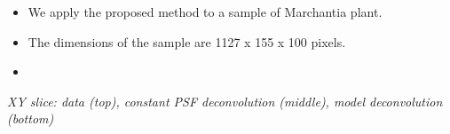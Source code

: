 \documentclass[a0paper,portrait,fontscale=0.35]{baposter}
\newcommand{\mycaption}[1]{
  {
    \smaller
    \emph{#1}
  }
}
\theoremstyle{plain}
\theoremstyle{plain}
\theoremstyle{definition}
\theoremstyle{plain}
\theoremstyle{definition}
\begin{document}
\begin{poster}
{\begin{minipage}[t]{0.48\textwidth}
\begin{minipage}[t]{0.5\textwidth}
      \begin{itemize}
        \item We apply the proposed method to a sample of 
          Marchantia plant.
        \item The dimensions of the sample 
          are 1127 x 155 x 100 pixels.

        \item
      \end{itemize}
    \end{minipage}
    \begin{minipage}[t]{0.49\textwidth}
      \centering

      \vspace{-1em}
      \begin{center}
        \mycaption{
          XY slice: data (top), constant PSF deconvolution (middle),
          model deconvolution (bottom)
        }
      \end{center}


\end{minipage}
\end{minipage}}
\end{poster}
\end{document}
